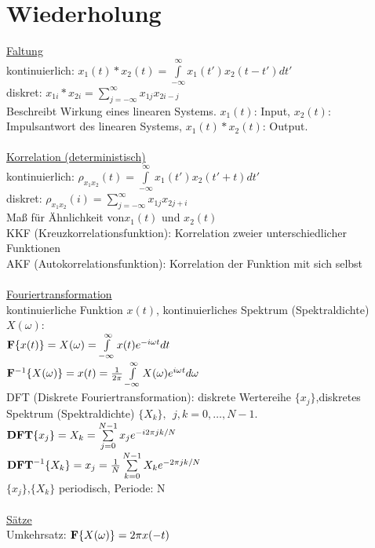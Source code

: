 \chapter{Wiederholung}
\underline{Faltung} \\
kontinuierlich: $x_1(t) \ast x_2(t)= \int\limits_{-\infty}^{\infty} x_1(t')x_2(t-t')dt'$\\
diskret: $x_{1i} \ast x_{2i} = \sum\limits_{j=-\infty}^{\infty} x_{1j} x_{2i-j}$\\
Beschreibt Wirkung eines linearen Systems. $x_1(t)$: Input, $x_2(t)$: Impulsantwort des linearen Systems, $x_1(t) \ast x_2(t)$: Output. \\
\\
\underline{Korrelation (deterministisch)}\\
kontinuierlich: $\rho_{x_1x_2}(t)= \int\limits_{-\infty}^{\infty} x_1(t')x_2(t'+t)dt'$\\
diskret: $\rho_{x_1x_2}(i) = \sum\limits_{j=-\infty}^{\infty} x_{1j} x_{2j+i}$\\
Maß für Ähnlichkeit von$ x_1(t)$ und $x_2(t)$\\
KKF (Kreuzkorrelationsfunktion): Korrelation zweier unterschiedlicher Funktionen\\
AKF (Autokorrelationsfunktion): Korrelation der Funktion mit sich selbst\\
\\
\underline{Fouriertransformation}\\
kontinuierliche Funktion $x(t)$, kontinuierliches Spektrum (Spektraldichte) $X(\omega)$:\\ 
${\bf F}\{x(t)\} = X(\omega)=\int\limits_{-\infty}^{\infty} x(t) e^{-i\omega t}dt$\\
${\bf F}^{-1}\{X(\omega)\} = x(t)=\frac {1}{2\pi}\int\limits_{-\infty}^{\infty} X(\omega) e^{i\omega t}d\omega$\\
DFT (Diskrete Fouriertransformation): diskrete Wertereihe $\{x_j\}$,diskretes Spektrum (Spektraldichte) $\{X_k\}, ~~ j,k=0,\dots,N-1$.\\
${\bf DFT}\{ x_j \} = X_k=\sum\limits_{j=0}^{N-1}x_j e^{-i2\pi jk/N}$\\
${\bf DFT}^{-1}\{X_k\} = x_j=\frac{1}{N} \sum\limits_{k=0}^{N-1}X_k e^{-2\pi jk/N}$\\
$\{x_j\}$,$\{X_k\}$\hspace*{1cm} periodisch, Periode: N\\
\\
\underline{Sätze}\\
Umkehrsatz: ${\bf F} \{X(\omega)\}=2\pi x(-t)$\\
